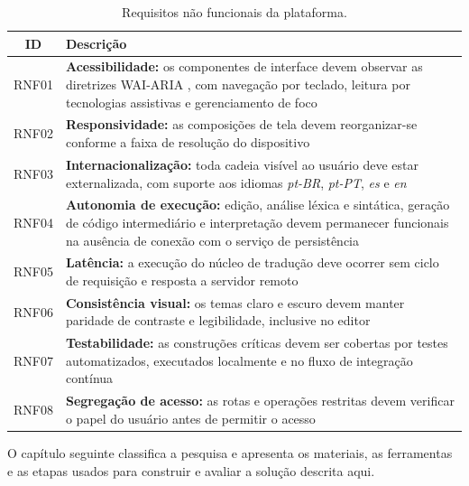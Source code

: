 \begin{table}[htbp]
    \centering
    \caption{Requisitos não funcionais da plataforma.}
    \label{tab:requisitos-nao-funcionais}
    \footnotesize
    \setlength{\tabcolsep}{4pt}
    \renewcommand{\arraystretch}{1.15}
    \begin{tabular}{|c|>{\raggedright\arraybackslash}p{12.3cm}|}
        \hline
        \textbf{ID} & \textbf{Descrição} \\
        \hline
        RNF01 & \textbf{Acessibilidade:} os componentes de interface devem observar as diretrizes WAI-ARIA \cite{w3c2023aria}, com navegação por teclado, leitura por tecnologias assistivas e gerenciamento de foco \\
        \hline
        RNF02 & \textbf{Responsividade:} as composições de tela devem reorganizar-se conforme a faixa de resolução do dispositivo \\
        \hline
        RNF03 & \textbf{Internacionalização:} toda cadeia visível ao usuário deve estar externalizada, com suporte aos idiomas \textit{pt-BR}, \textit{pt-PT}, \textit{es} e \textit{en} \\
        \hline
        RNF04 & \textbf{Autonomia de execução:} edição, análise léxica e sintática, geração de código intermediário e interpretação devem permanecer funcionais na ausência de conexão com o serviço de persistência \\
        \hline
        RNF05 & \textbf{Latência:} a execução do núcleo de tradução deve ocorrer sem ciclo de requisição e resposta a servidor remoto \\
        \hline
        RNF06 & \textbf{Consistência visual:} os temas claro e escuro devem manter paridade de contraste e legibilidade, inclusive no editor \\
        \hline
        RNF07 & \textbf{Testabilidade:} as construções críticas devem ser cobertas por testes automatizados, executados localmente e no fluxo de integração contínua \\
        \hline
        RNF08 & \textbf{Segregação de acesso:} as rotas e operações restritas devem verificar o papel do usuário antes de permitir o acesso \\
        \hline
    \end{tabular}
\end{table}

O capítulo seguinte classifica a pesquisa e apresenta os materiais, as ferramentas e as etapas usados para construir e avaliar a solução descrita aqui.
